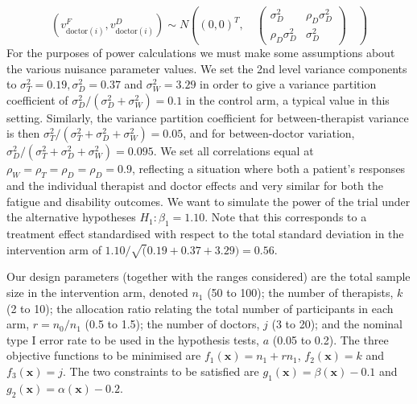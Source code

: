 \documentclass[sagev, Crown]{sagej}
\begin{document}
$$
(v_{\text{doctor}(i)}^F, v_{\text{doctor}(i)}^D) \sim N\left( (0,0)^T, \quad
\begin{pmatrix} 
\sigma_D^2  & \rho_D \sigma_D^2  \\
\rho_D \sigma_D^2  & \sigma_D^2 
\end{pmatrix}
\quad \right)
$$
For the purposes of power calculations we must make some assumptions about the various nuisance parameter values. We set the 2nd level variance components to $\sigma_{T}^{2} = 0.19, \sigma_{D}^{2} = 0.37$ and $\sigma_W^2 = 3.29$ in order to give a variance partition coefficient of $\sigma_D^2 / (\sigma^2_D + \sigma^2_W) = 0.1$ in the control arm, a typical value in this setting. Similarly, the variance partition coefficient for between-therapist variance is then $\sigma^2_T/(\sigma^2_T + \sigma^2_D + \sigma^2_W) = 0.05$, and for between-doctor variation, $\sigma^2_D/(\sigma^2_T + \sigma^2_D + \sigma^2_W) = 0.095$. We set all correlations equal at $\rho_W = \rho_T = \rho_D = \rho_D = 0.9$, reflecting a situation where both a patient's responses and the individual therapist and doctor effects and very similar for both the fatigue and disability outcomes. We want to simulate the power of the trial under the alternative hypotheses $H_1: \beta_1 = 1.10$. Note that this corresponds to a treatment effect standardised with respect to the total standard deviation in the intervention arm of $1.10/\sqrt(0.19+0.37+3.29) = 0.56$.

Our design parameters (together with the ranges considered) are the total sample size in the intervention arm, denoted $n_1$ (50 to 100); the number of therapists, $k$ (2 to 10); the allocation ratio relating the total number of participants in each arm, $r = n_0/n_1$ (0.5 to 1.5); the number of doctors, $j$ (3 to 20); and the nominal type I error rate to be used in the hypothesis tests, $a$ (0.05 to 0.2). The three objective functions to be minimised are $f_{1}(\mathbf{x}) = n_1 + rn_1$, $f_{2}(\mathbf{x}) = k$ and $f_{3}(\mathbf{x}) = j$. The two constraints to be satisfied are $g_{1}(\mathbf{x}) = \beta(\mathbf{x}) - 0.1$ and $g_{2}(\mathbf{x}) = \alpha(\mathbf{x}) - 0.2$.
\end{document}
